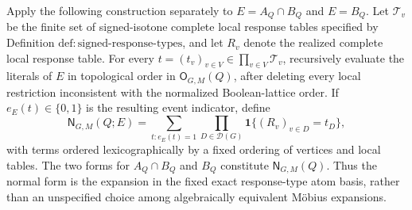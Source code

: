 Apply the following construction separately to \(E=A_Q\cap B_Q\) and \(E=B_Q\). Let \(\mathcal T_v\) be the finite set of signed-isotone complete local response tables specified by Definition \(\mathrm{def:signed\text{-}response\text{-}types}\), and let \(R_v\) denote the realized complete local response table. For every \(t=(t_v)_{v\in V}\in\prod_{v\in V}\mathcal T_v\), recursively evaluate the literals of \(E\) in topological order in \(\mathsf O_{G,M}(Q)\), after deleting every local restriction inconsistent with the normalized Boolean-lattice order. If \(e_E(t)\in\{0,1\}\) is the resulting event indicator, define
\[
 \mathsf N_{G,M}(Q;E)
 =\sum_{t:e_E(t)=1}\prod_{D\in\mathcal D(G)}
 \mathbf 1\{(R_v)_{v\in D}=t_D\},
\]
with terms ordered lexicographically by a fixed ordering of vertices and local tables. The two forms for \(A_Q\cap B_Q\) and \(B_Q\) constitute \(\mathsf N_{G,M}(Q)\). Thus the normal form is the expansion in the fixed exact response-type atom basis, rather than an unspecified choice among algebraically equivalent M\"obius expansions.